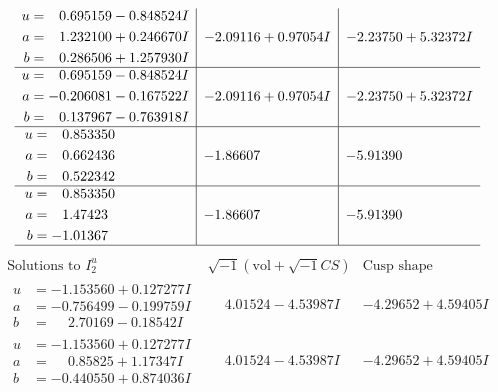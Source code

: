 \documentclass[1p]{elsarticle_modified}
\theoremstyle{definition}
\newcommand{\I}{\sqrt{-1}}
\begin{document}
$$\begin{array}{c|c|c}
\begin{aligned}
u &= \phantom{-}0.695159 - 0.848524 I \\
a &= \phantom{-}1.232100 + 0.246670 I \\
b &= \phantom{-}0.286506 + 1.257930 I\end{aligned}
 & -2.09116 + 0.97054 I & -2.23750 + 5.32372 I \\ \hline\begin{aligned}
u &= \phantom{-}0.695159 - 0.848524 I \\
a &= -0.206081 - 0.167522 I \\
b &= \phantom{-}0.137967 - 0.763918 I\end{aligned}
 & -2.09116 + 0.97054 I & -2.23750 + 5.32372 I \\ \hline\begin{aligned}
u &= \phantom{-}0.853350\phantom{ +0.000000I} \\
a &= \phantom{-}0.662436\phantom{ +0.000000I} \\
b &= \phantom{-}0.522342\phantom{ +0.000000I}\end{aligned}
 & -1.86607\phantom{ +0.000000I} & -5.91390\phantom{ +0.000000I} \\ \hline\begin{aligned}
u &= \phantom{-}0.853350\phantom{ +0.000000I} \\
a &= \phantom{-}1.47423\phantom{ +0.000000I} \\
b &= -1.01367\phantom{ +0.000000I}\end{aligned}
 & -1.86607\phantom{ +0.000000I} & -5.91390\phantom{ +0.000000I}\\
 \hline 
 \end{array}$$\newpage$$\begin{array}{c|c|c}  
\text{Solutions to }I^u_{2}& \I (\text{vol} + \sqrt{-1}CS) & \text{Cusp shape}\\
 \hline 
\begin{aligned}
u &= -1.153560 + 0.127277 I \\
a &= -0.756499 - 0.199759 I \\
b &= \phantom{-}2.70169 - 0.18542 I\end{aligned}
 & \phantom{-}4.01524 - 4.53987 I & -4.29652 + 4.59405 I \\ \hline\begin{aligned}
u &= -1.153560 + 0.127277 I \\
a &= \phantom{-}0.85825 + 1.17347 I \\
b &= -0.440550 + 0.874036 I\end{aligned}
 & \phantom{-}4.01524 - 4.53987 I & -4.29652 + 4.59405 I \\ \hline\begin{aligned}

\end{aligned}
\end{array}$$
\end{document}
